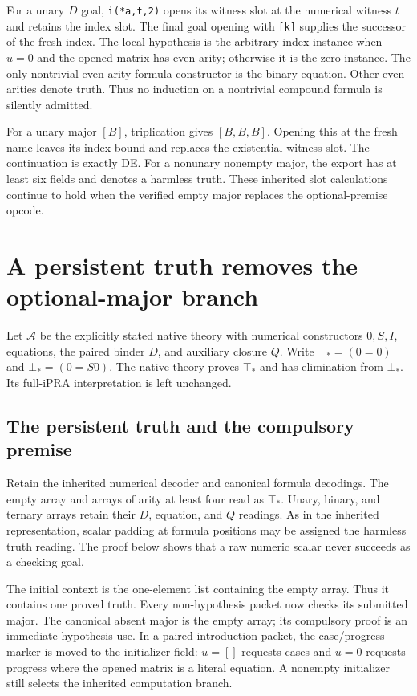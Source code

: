 \documentclass[11pt,letterpaper]{article}
\theoremstyle{definition}\newtheorem{definition}[theorem]{Definition}
\theoremstyle{remark}\newtheorem{remark}[theorem]{Remark}
\begin{document}
For a unary \(D\) goal, \texttt{i(*a,t,2)} opens its witness slot
at the numerical witness \(t\) and retains the index slot. The final
goal opening with \texttt{[k]} supplies the successor of the fresh
index. The local hypothesis is the arbitrary-index instance when
\(u=0\) and the opened matrix has even arity; otherwise it is the
zero instance. The only nontrivial even-arity formula constructor is
the binary equation. Other even arities denote truth. Thus no
induction on a nontrivial compound formula is silently admitted.

For a unary major \([B]\), triplication gives \([B,B,B]\). Opening
this at the fresh name leaves its index bound and replaces the
existential witness slot. The continuation is exactly DE. For a
nonunary nonempty major, the export has at least six fields and
denotes a harmless truth. These inherited slot calculations continue
to hold when the verified empty major replaces the optional-premise
opcode.



\section{A persistent truth removes the optional-major branch}
\label{sec:mandatory-major}

Let $\mathcal A$ be the explicitly stated native theory with numerical
constructors $0,S,I$, equations, the paired binder $D$, and auxiliary
closure $Q$.  Write $\top_*=(0=0)$ and $\bot_*=(0=S0)$.
The native theory proves $\top_*$ and has elimination from $\bot_*$.
Its full-iPRA interpretation is left unchanged.

\subsection{The persistent truth and the compulsory premise}

Retain the inherited numerical decoder and canonical formula decodings.
The empty array and arrays of arity at least four read as $\top_*$.
Unary, binary, and ternary arrays retain their $D$, equation, and $Q$
readings.  As in the inherited representation, scalar padding at formula
positions may be assigned the harmless truth reading.  The proof below
shows that a raw numeric scalar never succeeds as a checking goal.

The initial context is the one-element list containing the empty array.
Thus it contains one proved truth.  Every non-hypothesis packet now
checks its submitted major.  The canonical absent major is the empty
array; its compulsory proof is an immediate hypothesis use.  In a
paired-introduction packet, the case/progress marker is moved to the
initializer field: $u=[]$ requests cases and $u=0$ requests progress
where the opened matrix is a literal equation.  A nonempty initializer
still selects the inherited computation branch.
\end{document}
